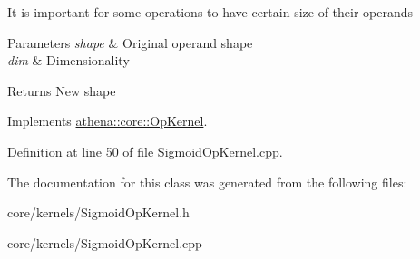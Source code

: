 It is important for some operations to have certain size of their operands 
\begin{DoxyParams}{Parameters}
{\em shape} & Original operand shape \\
\hline
{\em dim} & Dimensionality \\
\hline
\end{DoxyParams}
\begin{DoxyReturn}{Returns}
New shape 
\end{DoxyReturn}


Implements \mbox{\hyperlink{classathena_1_1core_1_1_op_kernel_a762e541463ffd089b47a8e6755c30fe1}{athena\+::core\+::\+Op\+Kernel}}.



Definition at line 50 of file Sigmoid\+Op\+Kernel.\+cpp.



The documentation for this class was generated from the following files\+:\begin{DoxyCompactItemize}
\item 
core/kernels/Sigmoid\+Op\+Kernel.\+h\item 
core/kernels/Sigmoid\+Op\+Kernel.\+cpp\end{DoxyCompactItemize}

